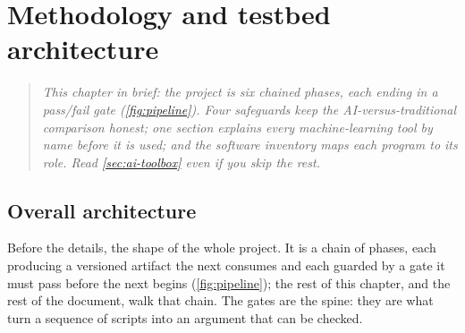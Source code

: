 \chapter{Methodology and testbed architecture}
\label{ch:methodology}

\begin{quote}\itshape
This chapter in brief: the project is six chained phases, each ending in a pass/fail gate
(\cref{fig:pipeline}). Four safeguards keep the AI-versus-traditional comparison honest;
one section explains every machine-learning tool by name before it is used; and the software
inventory maps each program to its role. Read \cref{sec:ai-toolbox} even if you skip the rest.
\end{quote}



\section{Overall architecture}

Before the details, the shape of the whole project. It is a chain of phases, each producing a
versioned artifact the next consumes and each guarded by a gate it must pass before the next
begins (\cref{fig:pipeline}); the rest of this chapter, and the rest of the document, walk that
chain. The gates are the spine: they are what turn a sequence of scripts into an argument that
can be checked.

